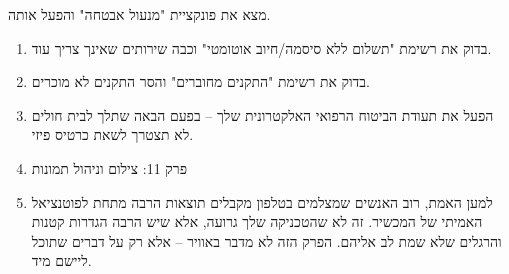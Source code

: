 \begin{tcbpractice}{מצא את פונקציית "מנעול אבטחה" והפעל אותה.}
\begin{enumerate}
  \item בדוק את רשימת "תשלום ללא סיסמה/חיוב אוטומטי" וכבה שירותים שאינך צריך עוד.
  \item בדוק את רשימת "התקנים מחוברים" והסר התקנים לא מוכרים.
  \item הפעל את תעודת הביטוח הרפואי האלקטרונית שלך – בפעם הבאה שתלך לבית חולים לא תצטרך לשאת כרטיס פיזי.
  \item פרק 11: צילום וניהול תמונות
  \item למען האמת, רוב האנשים שמצלמים בטלפון מקבלים תוצאות הרבה מתחת לפוטנציאל האמיתי של המכשיר. זה לא שהטכניקה שלך גרועה, אלא שיש הרבה הגדרות קטנות והרגלים שלא שמת לב אליהם. הפרק הזה לא מדבר באוויר – אלא רק על דברים שתוכל ליישם מיד.
\end{enumerate}

\end{tcbpractice}
